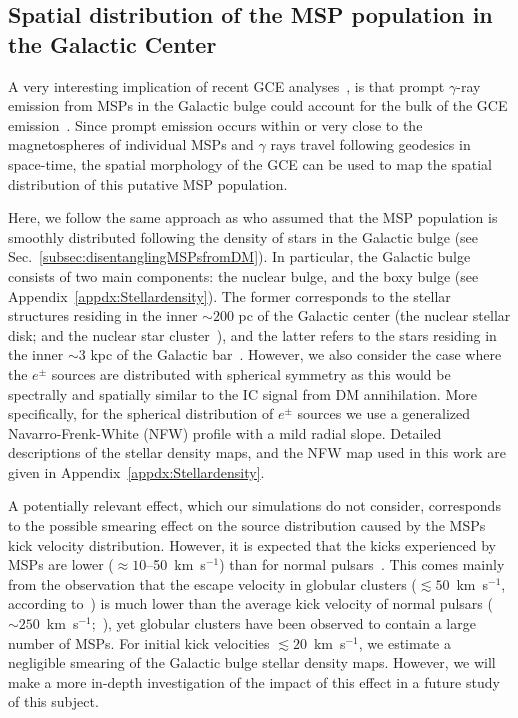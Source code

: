 \documentclass[doublespace,draft,nopageskip]{VTthesis} %
\begin{document}
\subsection{Spatial distribution of the MSP population in the Galactic Center}
\label{subsec:spatialdistribution}

A very interesting implication of recent GCE analyses~\citep{Macias:2016nev,Bartels:2017vsx,Macias:2019omb,Abazajian:2020tww}, is that prompt $\gamma$-ray emission from MSPs in the Galactic bulge could account for the bulk of the GCE emission~\citep{Abazajian:2012pn}. Since 
prompt emission occurs within or very close to the magnetospheres of individual MSPs and
$\gamma$ rays travel following geodesics in space-time, the spatial morphology of the GCE can be used to map the spatial distribution of this putative MSP population.

Here, we follow the same approach as \cite{Song:2019nrx} who assumed that the MSP population is smoothly distributed following the density of stars in the Galactic bulge (see Sec.~\ref{subsec:disentanglingMSPsfromDM}). 
In particular, the Galactic bulge consists of two main components: the nuclear bulge, and the boxy bulge (see Appendix~\ref{appdx:Stellardensity}). The former corresponds to the stellar structures residing in the inner $\sim 200$ pc of the Galactic center (the nuclear stellar disk; and the nuclear star cluster~\citealt{Launhardt:2002tx}), and the latter refers to the stars residing in the inner $\sim3$ kpc of the Galactic bar~\citep{Freudenreich:1998,Coleman:2019kax}. However, we also consider the 
case where the $e^\pm$ sources are distributed with spherical symmetry as this would be spectrally and spatially similar to the IC signal from DM annihilation. 
More specifically, for the spherical distribution of 
$e^\pm$ sources we use a generalized Navarro-Frenk-White (NFW) profile with a mild radial slope. 
Detailed descriptions of the stellar density maps, and the NFW map used in this work are given in Appendix~\ref{appdx:Stellardensity}. 

A potentially relevant effect, which our simulations do not consider, corresponds to the possible smearing effect on the source distribution caused by the MSPs kick velocity distribution. However, it is expected that the kicks experienced by MSPs are lower ($\approx 10$--50~km~s$^{-1}$) than for normal pulsars~\citep{Podsiadlowski:2005}. This comes mainly from the observation that the escape velocity in globular clusters ($\lesssim 50$~km~s$^{-1}$, according to~\citealt{Pfahl:2001df}) is much lower than the average kick velocity of normal pulsars ($\sim 250$~km~s$^{-1}$;~\citealt{Hobbs:2005yx,Atri:2019fbx}), yet globular clusters have been observed to contain a large number of MSPs. For initial kick velocities $\lesssim 20$~km~s$^{-1}$, we estimate a negligible smearing of the Galactic bulge stellar density maps. However, we will make a more in-depth investigation of the impact of this effect in a future study of this subject. 
\end{document}
